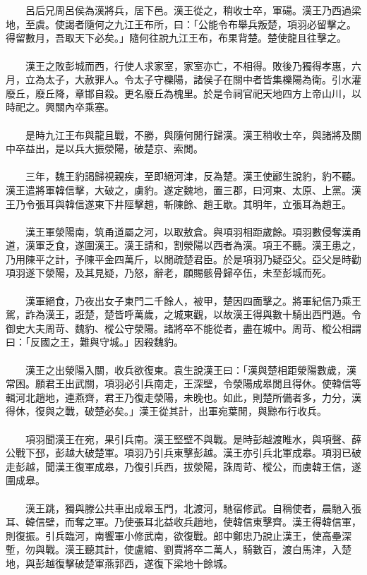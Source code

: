 \\\\
　　呂后兄周呂侯為漢將兵，居下邑。漢王從之，稍收士卒，軍碭。漢王乃西過梁地，至虞。使謁者隨何之九江王布所，曰：「公能令布舉兵叛楚，項羽必留擊之。得留數月，吾取天下必矣。」隨何往說九江王布，布果背楚。楚使龍且往擊之。
\\\\
　　漢王之敗彭城而西，行使人求家室，家室亦亡，不相得。敗後乃獨得孝惠，六月，立為太子，大赦罪人。令太子守櫟陽，諸侯子在關中者皆集櫟陽為衛。引水灌廢丘，廢丘降，章邯自殺。更名廢丘為槐里。於是令祠官祀天地四方上帝山川，以時祀之。興關內卒乘塞。
\\\\
　　是時九江王布與龍且戰，不勝，與隨何閒行歸漢。漢王稍收士卒，與諸將及關中卒益出，是以兵大振滎陽，破楚京、索閒。
\\\\
　　三年，魏王豹謁歸視親疾，至即絕河津，反為楚。漢王使酈生說豹，豹不聽。漢王遣將軍韓信擊，大破之，虜豹。遂定魏地，置三郡，曰河東、太原、上黨。漢王乃令張耳與韓信遂東下井陘擊趙，斬陳餘、趙王歇。其明年，立張耳為趙王。
\\\\
　　漢王軍滎陽南，筑甬道屬之河，以取敖倉。與項羽相距歲餘。項羽數侵奪漢甬道，漢軍乏食，遂圍漢王。漢王請和，割滎陽以西者為漢。項王不聽。漢王患之，乃用陳平之計，予陳平金四萬斤，以閒疏楚君臣。於是項羽乃疑亞父。亞父是時勸項羽遂下滎陽，及其見疑，乃怒，辭老，願賜骸骨歸卒伍，未至彭城而死。
\\\\
　　漢軍絕食，乃夜出女子東門二千餘人，被甲，楚因四面擊之。將軍紀信乃乘王駕，詐為漢王，誑楚，楚皆呼萬歲，之城東觀，以故漢王得與數十騎出西門遁。令御史大夫周苛、魏豹、樅公守滎陽。諸將卒不能從者，盡在城中。周苛、樅公相謂曰：「反國之王，難與守城。」因殺魏豹。
\\\\
　　漢王之出滎陽入關，收兵欲復東。袁生說漢王曰：「漢與楚相距滎陽數歲，漢常困。願君王出武關，項羽必引兵南走，王深壁，令滎陽成皋閒且得休。使韓信等輯河北趙地，連燕齊，君王乃復走滎陽，未晚也。如此，則楚所備者多，力分，漢得休，復與之戰，破楚必矣。」漢王從其計，出軍宛葉閒，與黥布行收兵。
\\\\
　　項羽聞漢王在宛，果引兵南。漢王堅壁不與戰。是時彭越渡睢水，與項聲、薛公戰下邳，彭越大破楚軍。項羽乃引兵東擊彭越。漢王亦引兵北軍成皋。項羽已破走彭越，聞漢王復軍成皋，乃復引兵西，拔滎陽，誅周苛、樅公，而虜韓王信，遂圍成皋。
\\\\
　　漢王跳，獨與滕公共車出成皋玉門，北渡河，馳宿修武。自稱使者，晨馳入張耳、韓信壁，而奪之軍。乃使張耳北益收兵趙地，使韓信東擊齊。漢王得韓信軍，則復振。引兵臨河，南饗軍小修武南，欲復戰。郎中鄭忠乃說止漢王，使高壘深塹，勿與戰。漢王聽其計，使盧綰、劉賈將卒二萬人，騎數百，渡白馬津，入楚地，與彭越復擊破楚軍燕郭西，遂復下梁地十餘城。
